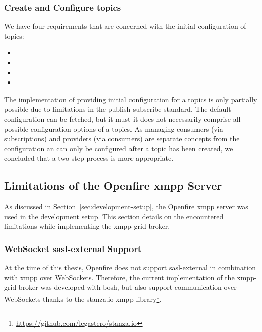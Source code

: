 \subsubsection{Create and Configure \glspl{topic}}

We have four requirements that are concerned with the initial configuration of \glspl{topic}:
\begin{itemize}
  \item {}
  \item {}
  \item {}
  \item {}
\end{itemize}

The implementation of providing initial configuration for a \glspl{topic} is only partially possible due to limitations in the \gls{publish-subscribe} standard. The default configuration can be fetched, but it must it does not necessarily comprise all possible configuration options of a \glspl{topic}.
As managing consumers (via subscriptions) and providers (via consumers) are separate concepts from the configuration an can only be configured after a \gls{topic} has been created, we concluded that a two-step process is more appropriate. ~\cite{xep-0060}

\subsection{Limitations of the Openfire \gls{xmpp} Server}\label{sec:limitations-of-the-openfire-xmpp-server}

As discussed in Section~\ref{sec:development-setup}, the Openfire \gls{xmpp} server was used in the development setup. This section details on the encountered limitations while implementing the \gls{xmpp-grid} \gls{broker}.

\subsubsection{WebSocket \gls{sasl-external} Support}

At the time of this thesis, Openfire does not support \gls{sasl-external} in combination with \gls{xmpp} over WebSockets.
Therefore, the current implementation of the \gls{xmpp-grid} \gls{broker} was developed with \gls{bosh}, but also support communication over WebSockets thanks to the stanza.io \gls{xmpp} library\footnote{\url{https://github.com/legastero/stanza.io}}.

